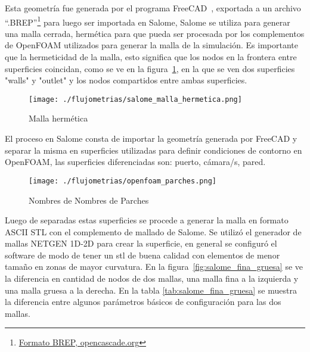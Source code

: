 Esta geometría fue generada por el programa FreeCAD~\parencite{freecad},
exportada a un archivo
``.BREP''\footnote{\href{https://dev.opencascade.org/doc/overview/html/specification\_\_brep\_format.html}{Formato
BREP, opencascade.org}} para luego ser importada en Salome\parencite{salome},
%
Salome se utiliza para generar una malla cerrada, hermética para que pueda ser
procesada por los complementos de OpenFOAM utilizados para generar la malla de
la simulación.
%
Es importante que la hermeticidad de la malla, esto significa que los nodos en
la frontera entre superficies coincidan, como se ve en la
figura~\ref{fig:salome_malla_hermetica}, en la que se ven dos superficies
"walls" y "outlet" y los nodos compartidos entre ambas superficies.
%
%
%

\begin{figure}
    \centering
    \texttt{[image: ./flujometrias/salome\_malla\_hermetica.png]}
    \caption{Malla hermética}\label{fig:salome_malla_hermetica}
\end{figure}

El proceso en Salome consta de importar la geometría generada por FreeCAD y
separar la misma en superficies utilizadas para definir condiciones de contorno
en OpenFOAM, las superficies diferenciadas son: puerto, cámara/s, pared.

\begin{figure}
    \centering
    \texttt{[image: ./flujometrias/openfoam\_parches.png]}
    \caption{Nombres de Nombres de Parches}\label{fig:openfoam_parches}
\end{figure}

Luego de separadas estas superficies se procede a generar la malla en formato
ASCII STL con el complemento de mallado de Salome.
%
Se utilizó el generador de mallas NETGEN 1D-2D para crear la superficie, en
general se configuró el software de modo de tener un stl de buena calidad con
elementos de menor tamaño en zonas de mayor curvatura.
%
En la figura~\ref{fig:salome_fina_gruesa} se ve la diferencia en cantidad de
nodos de dos mallas, una malla fina a la izquierda y una malla gruesa a la
derecha.
%
En la tabla \ref{tab:salome_fina_gruesa} se muestra la diferencia entre algunos
parámetros básicos de configuración para las dos mallas.
%

